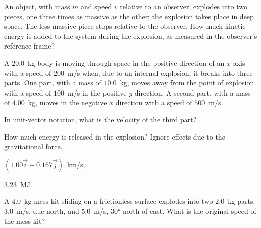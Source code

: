 \begin{problem}
	An object, with mass $m$ and speed $v$ relative to an observer, explodes into two pieces, one three times as massive as the other; the explosion takes place in deep space. The less massive piece stops relative to the observer. How much kinetic energy is added to the system during the explosion, as measured in the observer’s reference frame?
\end{problem}

\begin{problem}
	A $20.0$~kg body is moving through space in the positive direction of an $x$ axis with a speed of $200$~m/s when, due to an internal explosion, it breaks into three parts. One part, with a mass of $10.0$~kg, moves away from the point of explosion with a speed of $100$~m/s in the positive $y$ direction. A second part, with a mass of $4.00$~kg, moves in the negative $x$ direction with a speed of $500$~m/s. 
	\begin{enumerate*}[label=(\alph*)]
		\item In unit-vector notation, what is the velocity of the third part?
		\item How much energy is released in the explosion? Ignore effects due to the gravitational force.
	\end{enumerate*}
	\begin{solution}
		\begin{enumerate*}[label=(\alph*)]
			\item $(1.00 \vec i - 0.167\vec j)$~km/s; 
			\item $3.23$~MJ.
		\end{enumerate*}
	\end{solution}
\end{problem}

\begin{problem}
	A $4.0$~kg mess kit sliding on a frictionless surface explodes into two $2.0$~kg parts: $3.0$~m/s, due north, and $5.0$~m/s, \ang{30} north of east. What is the original speed of the mess kit?
\end{problem}

